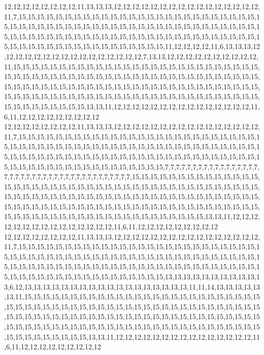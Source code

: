 12,12,12,12,12,12,12,12,11,13,13,13,12,12,12,12,12,12,12,12,12,12,12,12,12,12,12,12,11,7,15,15,15,15,15,15,15,15,15,15,15,15,15,15,15,15,15,15,15,15,15,15,15,15,15,15,15,15,15,15,15,15,15,15,15,15,15,15,15,15,15,15,15,15,15,15,15,15,15,15,15,15,15,15,15,15,15,15,15,15,15,15,15,15,15,15,15,15,15,15,15,15,15,15,15,15,15,15,15,15,15,15,15,15,15,15,15,15,15,15,15,15,15,15,15,15,15,15,15,15,11,12,12,12,12,11,6,13,13,13,12,12,12,12,12,12,12,12,12,12,12,12,12,12,12,12,7,13,13,12,12,12,12,12,12,12,12,12,12,11,15,15,15,15,15,15,15,15,15,15,15,15,15,15,15,15,15,15,15,15,15,15,15,15,15,15,15,15,15,15,15,15,15,15,15,15,15,15,15,15,15,15,15,15,15,15,15,15,15,15,15,15,15,15,15,15,15,15,15,15,15,15,15,15,15,15,15,15,15,15,15,15,15,15,15,15,15,15,15,15,15,15,15,15,15,15,15,15,15,15,15,15,15,15,15,15,15,15,15,15,15,15,15,15,15,15,15,15,15,15,15,15,15,15,15,15,15,15,15,15,13,13,11,12,12,12,12,12,12,12,12,12,12,12,12,12,12,12,11,6,11,12,12,12,12,12,12,12,12,12
12,12,12,12,12,12,12,12,11,13,13,13,12,12,12,12,12,12,12,12,12,12,12,12,12,12,12,12,11,7,15,15,15,15,15,15,15,15,15,15,15,15,15,15,15,15,15,15,15,15,15,15,15,15,15,15,15,15,15,15,15,15,15,15,15,15,15,15,15,15,15,15,15,15,15,15,15,15,15,15,15,15,15,15,15,15,15,15,15,15,15,15,15,15,15,15,15,15,15,15,15,15,15,15,15,15,15,15,15,15,15,15,15,15,15,15,15,15,15,15,15,15,15,15,15,15,15,15,15,15,7,7,7,7,7,7,7,7,7,7,7,7,7,7,7,7,7,7,7,7,7,7,7,7,7,7,7,7,7,7,7,7,7,7,7,7,7,7,7,7,15,15,15,15,15,15,15,15,15,15,15,15,15,15,15,15,15,15,15,15,15,15,15,15,15,15,15,15,15,15,15,15,15,15,15,15,15,15,15,15,15,15,15,15,15,15,15,15,15,15,15,15,15,15,15,15,15,15,15,15,15,15,15,15,15,15,15,15,15,15,15,15,15,15,15,15,15,15,15,15,15,15,15,15,15,15,15,15,15,15,15,15,15,15,15,15,15,15,15,15,15,15,15,15,15,15,15,15,15,15,15,15,15,15,15,15,15,15,15,15,13,13,11,12,12,12,12,12,12,12,12,12,12,12,12,12,12,12,11,6,11,12,12,12,12,12,12,12,12,12
12,12,12,12,12,12,12,12,11,13,13,13,12,12,12,12,12,12,12,12,12,12,12,12,12,12,12,12,11,7,15,15,15,15,15,15,15,15,15,15,15,15,15,15,15,15,15,15,15,15,15,15,15,15,15,15,15,15,15,15,15,15,15,15,15,15,15,15,15,15,15,15,15,15,15,15,15,15,15,15,15,15,15,15,15,15,15,15,15,15,15,15,15,15,15,15,15,15,15,15,15,15,15,15,15,15,15,15,15,15,15,15,15,15,15,15,15,15,15,15,15,15,15,15,15,15,15,15,15,15,13,13,13,13,13,13,13,13,13,13,13,6,12,13,13,13,13,13,13,13,13,13,13,13,13,13,13,13,13,13,13,11,11,14,13,13,13,13,13,13,11,15,15,15,15,15,15,15,15,15,15,15,15,15,15,15,15,15,15,15,15,15,15,15,15,15,15,15,15,15,15,15,15,15,15,15,15,15,15,15,15,15,15,15,15,15,15,15,15,15,15,15,15,15,15,15,15,15,15,15,15,15,15,15,15,15,15,15,15,15,15,15,15,15,15,15,15,15,15,15,15,15,15,15,15,15,15,15,15,15,15,15,15,15,15,15,15,15,15,15,15,15,15,15,15,15,15,15,15,15,15,15,15,15,15,15,15,15,15,15,13,13,11,12,12,12,12,12,12,12,12,12,12,12,12,12,12,12,11,6,11,12,12,12,12,12,12,12,12,12
